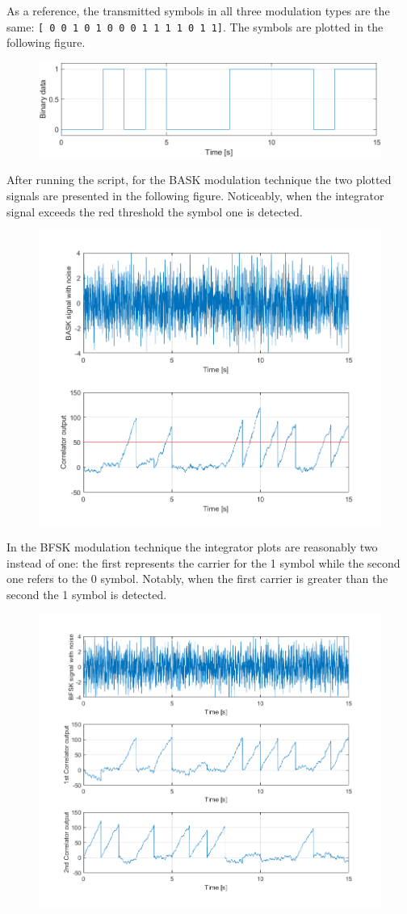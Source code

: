 \noindent As a reference, the transmitted symbols in all three modulation types are the same: \texttt{[ 0 0 1 0 1 0 0 0 1 1 1 1 0 1 1]}. The symbols are plotted in the following figure.

\begin{figure}[h!]
    \centering
    \includegraphics[width = .7\textwidth]{lab-4/imgs/initial-data.png}
\end{figure}

\FloatBarrier\noindent After running the script, for the BASK modulation technique the two plotted signals are presented in the following figure. Noticeably, when the integrator signal exceeds the red threshold the symbol one is detected.

\begin{figure}[h!]
    \centering
    \includegraphics[width = .7\textwidth]{lab-4/imgs/BASK.png}
\end{figure}

\FloatBarrier\noindent In the BFSK modulation technique the integrator plots are reasonably two instead of one: the first represents the carrier for the 1 symbol while the second one refers to the 0 symbol. Notably, when the first carrier is greater than the second the 1 symbol is detected.
\begin{figure}[h!]
    \centering
    \includegraphics[width = .7\textwidth]{lab-4/imgs/BFSK.png}
\end{figure}

